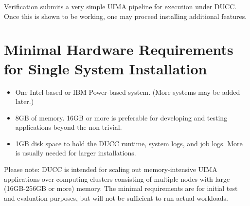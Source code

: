 Verification submits a very simple UIMA pipeline for execution under DUCC.  Once this is shown to be
working, one may proceed installing additional features.


\section{Minimal Hardware Requirements for Single System Installation}
\begin{itemize}
    \item One Intel-based or IBM Power-based system.  (More systems may be added later.)

    \item 8GB of memory.  16GB or more is preferable for developing and testing applications beyond
      the non-trivial.  

    \item 1GB disk space to hold the DUCC runtime, system logs, and job logs.  More is
      usually needed for larger installations.  
\end{itemize}

Please note: DUCC is intended for scaling out memory-intensive UIMA applications over computing
clusters consisting of multiple nodes with large (16GB-256GB or more) memory.  The minimal
requirements are for initial test and evaluation purposes, but will not be sufficient to run actual
workloads.

